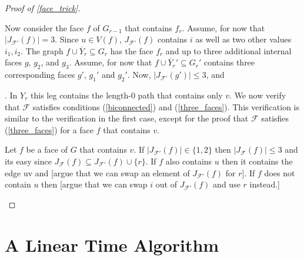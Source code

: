 \documentclass{patmorin}
\begin{document}
\begin{proof}[Proof of \cref{face_trick}]
\begin{enumerate}
    Now consider the face $f$ of $G_{r-1}$ that contains $f_r$.  Assume, for now that $|J_{\mathcal{F'}}(f)|=3$.  Since $u\in V(f)$, $J_{\mathcal{F'}}(f)$ contains $i$ as well as two other values $i_1,i_2$.  The graph $f\cup\overline{Y}_r\subseteq G_r$ has the face $f_r$ and up to three additional internal faces $g$, $g_2$, and $g_3$.  Assume, for now that $f\cup\overline{Y}_r'\subseteq G_r'$ contains three corresponding faces $g'$, $g_1'$ and $g_2'$.  Now, $|J_{\mathcal{F'}}(g')|\le 3$, and






    .  In $Y_r$ this leg contains the length-$0$ path that contains only $v$.  We now verify that $\mathcal{F}$ satisfies conditions (\ref{biconnected}) and (\ref{three_faces}).  This verification is similar to the verification in the first case, except for the proof that $\mathcal{F}$ satisfies (\ref{three_faces}) for a face $f$ that contains $v$.

    Let $f$ be a face of $G$ that contains $v$.  If $|J_{\mathcal{F}'}(f)|\in\{1,2\}$ then $|J_{\mathcal{F}}(f)|\le 3$ and its easy since $J_{\mathcal{F}}(f)\subseteq J_{\mathcal{F'}}(f)\cup\{r\}$.  If $f$ also contains $u$ then it contains the edge uv and [argue that we can swap an element of $J_{\mathcal{F}'}(f)$ for $r$].  If $f$ does not contain $u$ then [argue that we can swap $i$ out of $J_{\mathcal{F}'}(f)$ and use $r$ instead.]  \qedhere
  \end{enumerate}
\end{proof}


\section{A Linear Time Algorithm}




\end{document}

